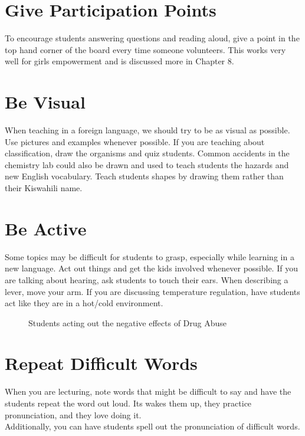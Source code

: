 \section{Give Participation Points}
To encourage students answering questions and reading aloud, give a point in the top hand corner of the board every time someone volunteers.   This works very well for girls empowerment and is discussed more in Chapter 8.\\

\section{Be Visual}
When teaching in a foreign language, we should try to be as visual as possible.  Use pictures and examples whenever possible.  If you are teaching about classification, draw the organisms and quiz students.  Common accidents in the chemistry lab could also be drawn and used to teach students the hazards and new English vocabulary.   Teach students shapes by drawing them rather than their Kiswahili name.\\ 

\section{Be Active}
Some topics may be difficult for students to grasp, especially while learning in a new language.  Act out things and get the kids involved whenever possible.  If you are talking about hearing, ask students to touch their ears.  When describing a lever, move your arm.  If you are discussing temperature regulation, have students act like they are in a hot/cold environment.\\  

\begin{figure}[h!]
\centering
\setlength\fboxsep{0pt}
\setlength\fboxrule{2pt}
\caption{Students acting out the negative effects of Drug Abuse}
\end{figure}

\section{Repeat Difficult Words}
When you are lecturing, note words that might be difficult to say and have the students repeat the word out loud.  Its wakes them up, they practice pronunciation, and they love doing it.\\
Additionally, you can have students spell out the pronunciation of difficult words.

